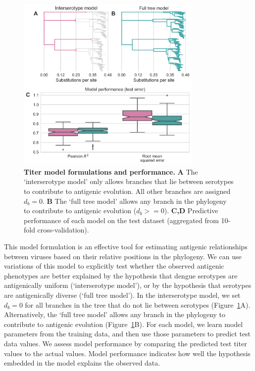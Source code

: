 \documentclass[11pt,oneside,letterpaper]{article}
\begin{document}
\begin{figure}[h]
  \begin{centering}
    \includegraphics[width=0.8\textwidth]{../figures/png/titer_model_performance.png}
        \caption{\textbf{Titer model formulations and performance.}
        \textbf{A} The `interserotype model' only allows branches that lie between serotypes to contribute to antigenic evolution.
        All other branches are assigned $d_b = 0$.
        \textbf{B} The `full tree model' allows any branch in the phylogeny to contribute to antigenic evolution ($d_b >= 0$).
        \textbf{C,D} Predictive performance of each model on the test dataset (aggregated from 10-fold cross-validation).
        }
         \label{titer_model_performance}
  \end{centering}
\end{figure}

This model formulation is an effective tool for estimating antigenic relationships between viruses based on their relative positions in the phylogeny.
We can use variations of this model to explicitly test whether the observed antigenic phenotypes are better explained by the hypothesis that dengue serotypes are antigenically uniform (`interserotype model'), or by the hypothesis that serotypes are antigenically diverse (`full tree model').
In the interserotype model, we set $d_b = 0$ for all branches in the tree that do not lie between serotypes (Figure~\ref{titer_model_performance}A).
Alternatively, the `full tree model' allows any branch in the phylogeny to contribute to antigenic evolution (Figure~\ref{titer_model_performance}B).
For each model, we learn model parameters from the training data, and then use those parameters to predict test data values.
We assess model performance by comparing the predicted test titer values to the actual values.
Model performance indicates how well the hypothesis embedded in the model explains the observed data.
\end{document}
